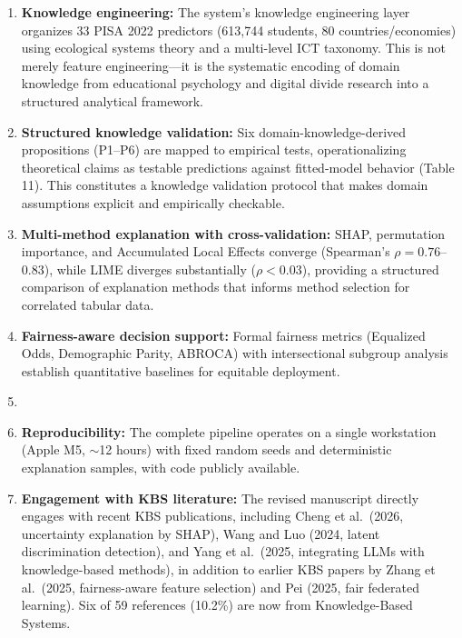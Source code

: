 \documentclass[12pt]{article}
\begin{document}
\begin{enumerate}
\item \textbf{Knowledge engineering:} The system's knowledge engineering layer organizes 33 PISA 2022 predictors (613,744 students, 80 countries/economies) using ecological systems theory and a multi-level ICT taxonomy. This is not merely feature engineering---it is the systematic encoding of domain knowledge from educational psychology and digital divide research into a structured analytical framework.

\item \textbf{Structured knowledge validation:} Six domain-knowledge-derived propositions (P1--P6) are mapped to empirical tests, operationalizing theoretical claims as testable predictions against fitted-model behavior (Table 11). This constitutes a knowledge validation protocol that makes domain assumptions explicit and empirically checkable.

\item \textbf{Multi-method explanation with cross-validation:} SHAP, permutation importance, and Accumulated Local Effects converge (Spearman's $\rho = 0.76$--$0.83$), while LIME diverges substantially ($\rho < 0.03$), providing a structured comparison of explanation methods that informs method selection for correlated tabular data.

\item \textbf{Fairness-aware decision support:} Formal fairness metrics (Equalized Odds, Demographic Parity, ABROCA) with intersectional subgroup analysis establish quantitative baselines for equitable deployment.

\item \item \textbf{Reproducibility:} The complete pipeline operates on a single workstation (Apple M5, $\sim$12 hours) with fixed random seeds and deterministic explanation samples, with code publicly available.

\item \textbf{Engagement with KBS literature:} The revised manuscript directly engages with recent KBS publications, including Cheng et al.\ (2026, uncertainty explanation by SHAP), Wang and Luo (2024, latent discrimination detection), and Yang et al.\ (2025, integrating LLMs with knowledge-based methods), in addition to earlier KBS papers by Zhang et al.\ (2025, fairness-aware feature selection) and Pei (2025, fair federated learning). Six of 59 references (10.2\%) are now from Knowledge-Based Systems.
\end{enumerate}
\end{document}
